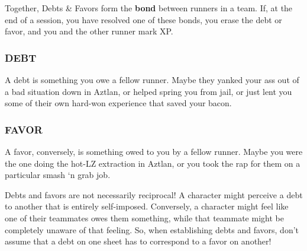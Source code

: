 \documentclass[oneside,10pt]{article}
\begin{document}
\begin{multicols}{2}
Together, Debts \& Favors form the \textbf{bond} between runners in
a team. If, at the end of a session, you have resolved one of
these bonds, you erase the debt or favor, and you and the
other runner mark XP.

\subsubsection{DEBT}
A debt is something you owe a fellow runner. Maybe they
yanked your ass out of a bad situation down in Aztlan, or
helped spring you from jail, or just lent you some of their own
hard-won experience that saved your bacon.

\subsubsection{FAVOR}
A favor, conversely, is something owed to you by a fellow
runner. Maybe you were the one doing the hot-LZ extraction
in Aztlan, or you took the rap for them on a particular smash
‘n grab job.

Debts and favors are not necessarily reciprocal! A character might
perceive a debt to another that is entirely self-imposed.  Conversely,
a character might feel like one of their teammates owes them
something, while that teammate might be completely unaware of that
feeling. So, when establishing debts and favors, don’t assume that a
debt on one sheet has to correspond to a favor on another!

\end{multicols}

\newpage

\end{document}
